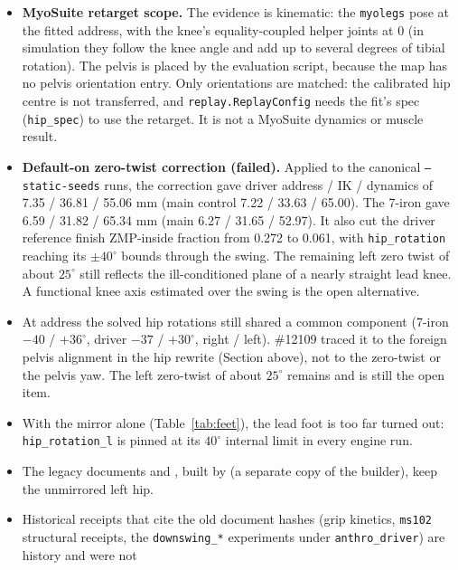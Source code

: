 \documentclass[11pt]{article}
\begin{document}
\begin{itemize}
  \item \textbf{MyoSuite retarget scope.} The evidence is kinematic: the
    \texttt{myolegs} pose at the fitted address, with the knee's
    equality-coupled helper joints at 0 (in simulation they follow the knee
    angle and add up to several degrees of tibial rotation). The pelvis is
    placed by the evaluation script, because the map has no pelvis
    orientation entry. Only orientations are matched: the calibrated hip
    centre is not transferred, and \texttt{replay.ReplayConfig} needs the fit's
    spec (\texttt{hip\_spec}) to use the retarget. It is not a MyoSuite
    dynamics or muscle result.
  \item \textbf{Default-on zero-twist correction (failed).} Applied to the
    canonical \texttt{--static-seeds} runs, the correction gave driver
    address / IK / dynamics of 7.35 / 36.81 / 55.06 mm (main control 7.22 /
    33.63 / 65.00). The 7-iron gave 6.59 / 31.82 / 65.34 mm (main 6.27 /
    31.65 / 52.97). It also cut the driver reference finish ZMP-inside
    fraction from 0.272 to 0.061, with \texttt{hip\_rotation} reaching its
    $\pm40^\circ$ bounds through the swing. The remaining left zero twist
    of about $25^\circ$ still reflects the ill-conditioned plane of a nearly
    straight lead knee. A functional knee axis estimated over the swing is
    the open alternative.
  \item At address the solved hip rotations still shared a common component
    (7-iron $-40$ / $+36^\circ$, driver $-37$ / $+30^\circ$, right / left).
    \#12109 traced it to the foreign pelvis alignment in the hip rewrite
    (Section above), not to the zero-twist or the pelvis yaw. The left
    zero-twist of about $25^\circ$ remains and is still the open item.
  \item With the mirror alone (Table~\ref{tab:feet}), the lead foot is too
    far turned out: \texttt{hip\_rotation\_l} is pinned at its $40^\circ$
    internal limit in every engine run.
  \item The legacy documents  and
    , built by
     (a
    separate copy of the builder), keep the unmirrored left hip.
  \item Historical receipts that cite the old document hashes (grip
    kinetics, \texttt{ms102} structural receipts, the \texttt{downswing\_*}
    experiments under \texttt{anthro\_driver}) are history and were not

\end{itemize}
\end{document}
